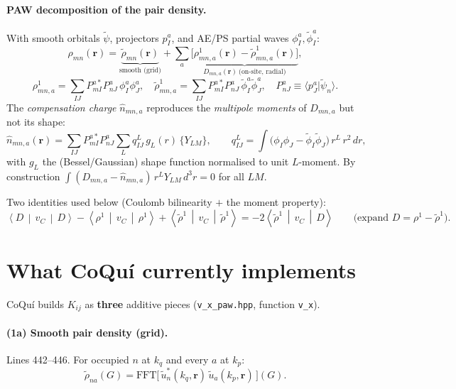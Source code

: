 \documentclass[11pt]{article}
\newcommand{\rt}{\tilde{\rho}}
\newcommand{\vc}{v_C}
\newcommand{\avg}[3]{\left\langle #1 \,\middle|\, #2 \,\middle|\, #3 \right\rangle}
\newcommand{\code}[1]{\texttt{\small #1}}
\begin{document}
\paragraph{PAW decomposition of the pair density.}
With smooth orbitals $\tilde\psi$, projectors $p_I^a$, and AE/PS partial waves
$\phi_I^a,\tilde\phi_I^a$:
\begin{equation}
\rho_{mn}(\mathbf r) = \underbrace{\rt_{mn}(\mathbf r)}_{\text{smooth (grid)}}
   + \sum_a \underbrace{\big[\rho^{1}_{mn,a}(\mathbf r) - \rt^{1}_{mn,a}(\mathbf r)\big]}_{\displaystyle D_{mn,a}(\mathbf r)\ \text{(on-site, radial)}} ,
\end{equation}
\begin{equation}
\rho^{1}_{mn,a} = \sum_{IJ} P^{a*}_{mI}P^{a}_{nJ}\,\phi_I^a\phi_J^a,\quad
\rt^{1}_{mn,a} = \sum_{IJ} P^{a*}_{mI}P^{a}_{nJ}\,\tilde\phi_I^a\tilde\phi_J^a,\quad
P^{a}_{nJ} \equiv \langle p_J^a | \tilde\psi_n\rangle .
\end{equation}
The \emph{compensation charge} $\hat n_{mn,a}$ reproduces the \emph{multipole
moments} of $D_{mn,a}$ but not its shape:
\begin{equation}
\hat n_{mn,a}(\mathbf r) = \sum_{IJ} P^{a*}_{mI}P^{a}_{nJ}\sum_{L} q^{L}_{IJ}\,g_L(r)\,\{Y_{LM}\},
\qquad
q^{L}_{IJ} = \int \big(\phi_I\phi_J - \tilde\phi_I\tilde\phi_J\big)\,r^{L}\,r^2\,dr ,
\end{equation}
with $g_L$ the (Bessel/Gaussian) shape function normalised to unit $L$-moment. By
construction $\int (D_{mn,a}-\hat n_{mn,a})\, r^L Y_{LM}\, d^3r = 0$ for all $LM$.

Two identities used below (Coulomb bilinearity $+$ the moment property):
\begin{equation}
\label{eq:id}
\avg{D}{\vc}{D} - \avg{\rho^1}{\vc}{\rho^1} + \avg{\rt^1}{\vc}{\rt^1} = -2\avg{\rt^1}{\vc}{D}
\qquad\text{(expand }D=\rho^1-\rt^1\text{).}
\end{equation}

\section{What CoQu\'i currently implements}

CoQu\'i builds $K_{ij}$ as \textbf{three} additive pieces (\code{v\_x\_paw.hpp},
function \code{v\_x}).

\paragraph{(1a) Smooth pair density (grid).} Lines 442--446. For occupied $n$ at
$k_q$ and every $a$ at $k_p$:
\begin{equation}
\rt_{na}(G) = \mathrm{FFT}\big[\, \tilde u^{*}_{n}(k_q,\mathbf r)\,\tilde u_{a}(k_p,\mathbf r)\,\big](G).
\end{equation}
\end{document}

